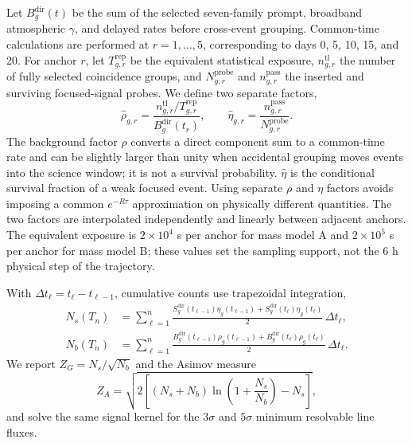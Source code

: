 \documentclass[11pt]{article}
\begin{document}
Let $B^{\mathrm{dir}}_g(t)$ be the sum of the selected seven-family prompt,
broadband atmospheric $\gamma$, and delayed rates before cross-event grouping. Common-time calculations are
performed at $r=1,\ldots,5$, corresponding to days 0, 5, 10, 15, and 20. For
anchor $r$, let $T^{\mathrm{rep}}_{g,r}$ be the equivalent statistical exposure,
$n^{\mathrm{tl}}_{g,r}$ the number of fully selected coincidence groups, and
$N^{\mathrm{probe}}_{g,r}$ and $n^{\mathrm{pass}}_{g,r}$ the inserted and
surviving focused-signal probes. We define two separate factors,
\begin{equation}
 \widehat\rho_{g,r}=
 \frac{n^{\mathrm{tl}}_{g,r}/T^{\mathrm{rep}}_{g,r}}
 {B^{\mathrm{dir}}_g(t_r)},\qquad
 \widehat\eta_{g,r}=
 \frac{n^{\mathrm{pass}}_{g,r}}{N^{\mathrm{probe}}_{g,r}}.
 \label{eq:anchor_time_factors}
\end{equation}
The background factor $\widehat\rho$ converts a direct component sum to a
common-time rate and can be slightly larger than unity when accidental grouping
moves events into the science window; it is not a survival probability.
$\widehat\eta$ is the conditional survival fraction of a weak focused event.
Using separate $\rho$ and $\eta$ factors avoids imposing a common
$e^{-R\tau}$ approximation on physically different quantities. The two factors
are interpolated independently and linearly between adjacent anchors. The
equivalent exposure is $2\times10^4$ s per anchor for mass model A and
$2\times10^5$ s per anchor for mass model B; these values set the sampling
support, not the 6 h physical step of the trajectory.

With $\Delta t_\ell=t_\ell-t_{\ell-1}$, cumulative counts use trapezoidal
integration,
\begin{equation}
 \begin{aligned}
 N_s(T_n)&=\sum_{\ell=1}^{n}\frac{S^{\mathrm{dir}}_g(t_{\ell-1})\eta_g(t_{\ell-1})+S^{\mathrm{dir}}_g(t_\ell)\eta_g(t_\ell)}{2}\,\Delta t_\ell,\\
 N_b(T_n)&=\sum_{\ell=1}^{n}\frac{B^{\mathrm{dir}}_g(t_{\ell-1})\rho_g(t_{\ell-1})+B^{\mathrm{dir}}_g(t_\ell)\rho_g(t_\ell)}{2}\,\Delta t_\ell.
 \end{aligned}
 \label{eq:cumulative_counts}
\end{equation}
We report $Z_G=N_s/\sqrt{N_b}$ and the Asimov measure
\begin{equation}
 Z_A=\sqrt{2\left[(N_s+N_b)\ln\left(1+\frac{N_s}{N_b}\right)-N_s\right]},
\end{equation}
and solve the same signal kernel for the $3\sigma$ and $5\sigma$ minimum
resolvable line fluxes.
\end{document}

